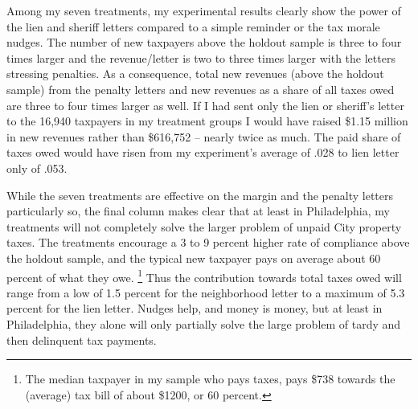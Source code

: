 Among my seven treatments, my experimental results clearly show the
power of the lien and sheriff letters compared to a simple reminder or
the tax morale nudges.  The number of new taxpayers above the holdout
sample is three to four times larger and the revenue/letter is two to
three times larger with the letters stressing penalties.  As a
consequence, total new revenues (above the holdout sample) from the
penalty letters and new revenues as a share of all taxes owed are
three to four times larger as well.  If I had sent only the lien or
sheriff's letter to the 16,940 taxpayers in my treatment groups I
would have raised \$1.15 million in new revenues rather than \$616,752
-- nearly twice as much.  The paid share of taxes owed would have
risen from my experiment's average of .028 to lien letter only of
.053.

While the seven treatments are effective on the margin and the penalty
letters particularly so, the final column makes clear that at least in
Philadelphia, my treatments will not completely solve the larger
problem of unpaid City property taxes.  The treatments encourage a 3
to 9 percent higher rate of compliance above the holdout sample, and
the typical new taxpayer pays on average about 60 percent of what they
owe. \footnote{The median taxpayer in my sample who pays taxes,
  pays \$738 towards the (average) tax bill of about \$1200, or 60
  percent.}  Thus the contribution towards total taxes owed will range
from a low of 1.5 percent for the neighborhood letter to a maximum of
5.3 percent for the lien letter.  Nudges help, and money is money, but
at least in Philadelphia, they alone will only partially solve the large problem
of tardy and then delinquent tax payments.

